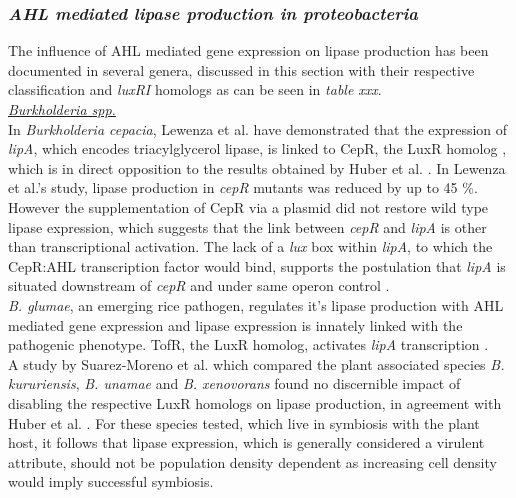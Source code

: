 \documentclass[twoside]{article}
\begin{document}
\subsubsection{\emph{AHL mediated lipase production in proteobacteria}}
The influence of AHL mediated gene expression on lipase production has been documented in several genera, discussed in this section with their respective classification and \emph{luxRI} homologs as can be seen in \emph{table xxx}.\\


\emph{\underline{Burkholderia spp.}} 
\\In \emph{Burkholderia cepacia}, Lewenza et al. have demonstrated that the expression of \emph{lipA}, which encodes triacylglycerol lipase, is linked to CepR, the LuxR homolog \cite{lewenza1999}, which is in direct opposition to the results obtained by Huber et al. \cite{huber2001}. In Lewenza et al.'s study, lipase production in \emph{cepR} mutants was reduced by up to 45 \%. However the supplementation of CepR via a plasmid did not restore wild type lipase expression, which suggests that the link between \emph{cepR} and \emph{lipA} is other than transcriptional activation. The lack of a \emph{lux} box within \emph{lipA}, to which the CepR:AHL transcription factor would bind, supports the postulation that \emph{lipA} is situated downstream of \emph{cepR} and under same operon control \cite{lewenza1999}.\\



\emph{B. glumae}, an emerging rice pathogen, regulates it's lipase production with AHL mediated gene expression and lipase expression is innately linked with the pathogenic phenotype. TofR, the LuxR homolog, activates \emph{lipA} transcription \cite{devescovi_07}. \\


A study by Suarez-Moreno et al. which compared the plant associated species \emph{B. kururiensis}, \emph{B. unamae} and \emph{B. xenovorans} found no discernible impact of disabling the respective LuxR homologs on lipase production, in agreement with Huber et al. \cite{huber2001,suarez2010}. For these species tested, which live in symbiosis with the plant host, it follows that lipase expression, which is generally considered a virulent attribute, should not be population density dependent as increasing cell density would imply successful symbiosis. \\
\end{document}
